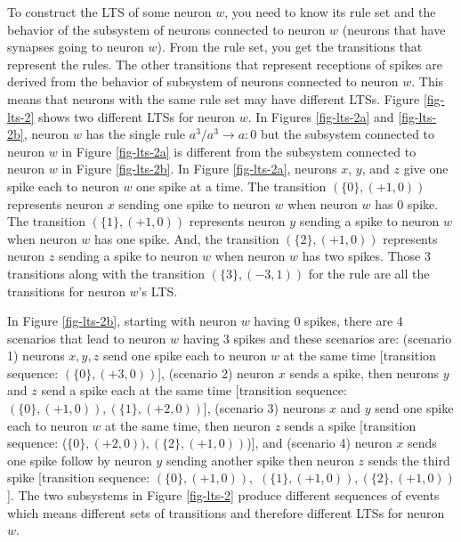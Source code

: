 \documentclass[runningheads,a4paper]{llncs}
\theoremstyle{definition}
\newcommand{\ra}{\rightarrow}
\begin{document}

To construct the LTS of some neuron $w$, you need to know its rule set and the behavior of the
subsystem of neurons connected to neuron $w$ (neurons that have synapses going to neuron $w$). From 
the rule set, you get the transitions that represent the rules. The other transitions that represent 
receptions of spikes are derived from the behavior of subsystem of neurons connected to neuron $w$.
This means that neurons with the same rule set may have different LTSs. Figure \ref{fig-lts-2} shows 
two different LTSs for neuron $w$. In Figures \ref{fig-lts-2a} and \ref{fig-lts-2b}, neuron $w$ has 
the single rule $a^3/a^3 \ra a:0$ but the subsystem connected to neuron $w$ in Figure 
\ref{fig-lts-2a} is different from the subsystem connected to neuron $w$ in Figure \ref{fig-lts-2b}.
In Figure \ref{fig-lts-2a}, neurons $x$, $y$, and $z$ give one spike each to neuron $w$ one spike at
a time. The transition $(\{0\},(+1,0))$ represents neuron $x$ sending one spike to neuron $w$ when
neuron $w$ has $0$ spike. The transition $(\{1\},(+1,0))$ represents neuron $y$ sending a spike to
neuron $w$ when neuron $w$ has one spike. And, the transition $(\{2\},(+1,0))$ represents neuron
$z$ sending a spike to neuron $w$ when neuron $w$ has two spikes. Those $3$ transitions along with
the transition $(\{3\},(-3,1))$ for the rule are all the transitions for neuron $w$'s LTS.

In Figure \ref{fig-lts-2b}, starting with neuron $w$ having $0$ spikes, there are 4 scenarios that 
lead to neuron $w$ having $3$ spikes and these scenarios are: (scenario 1) neurons $x,y,z$ send one 
spike each to neuron $w$ at the same time [transition sequence: $(\{0\},(+3,0))$], (scenario 2) 
neuron $x$ sends a spike, then neurons $y$ and $z$ send a spike each at the same time [transition 
sequence: $(\{0\},(+1,0)),(\{1\},(+2,0))$], (scenario 3) neurons $x$ and $y$ send one spike each to 
neuron $w$ at the same time, then neuron $z$ sends a spike [transition sequence: ($\{0\},(+2,0)),
(\{2\},(+1,0))$)], and (scenario 4) neuron $x$ sends one spike follow by neuron $y$ sending another
spike then neuron $z$ sends the third spike [transition sequence: $(\{0\},(+1,0)),$ $(\{1\},(+1,0)),
(\{2\},(+1,0))$]. The two subsystems in Figure \ref{fig-lts-2} produce different sequences of events
which means different sets of transitions and therefore different LTSs for neuron $w$.
\end{document}
